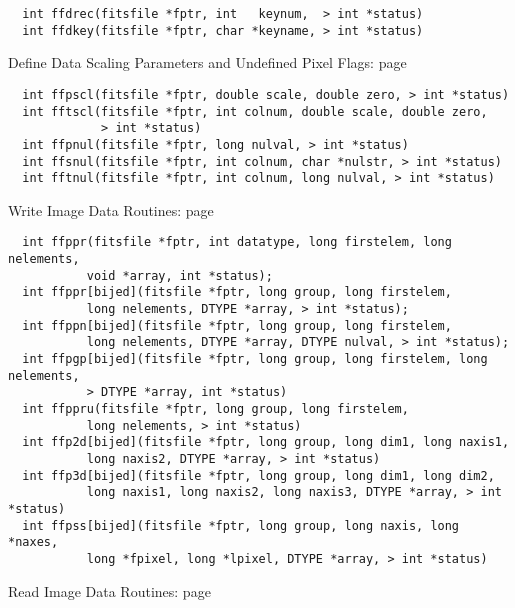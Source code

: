 \begin{verbatim}
  int ffdrec(fitsfile *fptr, int   keynum,  > int *status)
  int ffdkey(fitsfile *fptr, char *keyname, > int *status)
\end{verbatim}
 Define Data Scaling Parameters and Undefined Pixel Flags: page~\pageref{FFPSCL}

\begin{verbatim}
  int ffpscl(fitsfile *fptr, double scale, double zero, > int *status)
  int fftscl(fitsfile *fptr, int colnum, double scale, double zero,
             > int *status)
  int ffpnul(fitsfile *fptr, long nulval, > int *status)
  int ffsnul(fitsfile *fptr, int colnum, char *nulstr, > int *status)
  int fftnul(fitsfile *fptr, int colnum, long nulval, > int *status)
\end{verbatim}
 Write Image Data Routines: page~\pageref{FFPPR}

\begin{verbatim}
  int ffppr(fitsfile *fptr, int datatype, long firstelem, long nelements,
           void *array, int *status);
  int ffppr[bijed](fitsfile *fptr, long group, long firstelem,
           long nelements, DTYPE *array, > int *status);
  int ffppn[bijed](fitsfile *fptr, long group, long firstelem,
           long nelements, DTYPE *array, DTYPE nulval, > int *status);
  int ffpgp[bijed](fitsfile *fptr, long group, long firstelem, long nelements,
           > DTYPE *array, int *status)
  int ffppru(fitsfile *fptr, long group, long firstelem,
           long nelements, > int *status)
  int ffp2d[bijed](fitsfile *fptr, long group, long dim1, long naxis1,
           long naxis2, DTYPE *array, > int *status)
  int ffp3d[bijed](fitsfile *fptr, long group, long dim1, long dim2,
           long naxis1, long naxis2, long naxis3, DTYPE *array, > int *status)
  int ffpss[bijed](fitsfile *fptr, long group, long naxis, long *naxes,
           long *fpixel, long *lpixel, DTYPE *array, > int *status)
\end{verbatim}
 Read Image Data Routines: page~\pageref{FFGPV}

